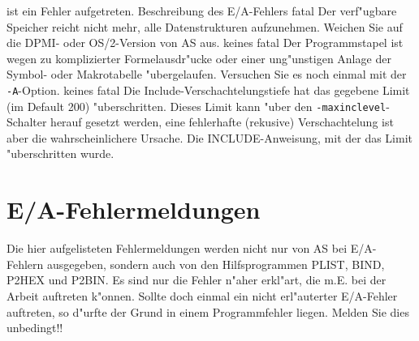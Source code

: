 \documentclass[12pt,a4paper,twoside]{report}
\newcommand{\tty}[1]{{\tt #1}}
\begin{document}
\begin{description}
{                ist ein Fehler aufgetreten.}
               {Beschreibung des E/A-Fehlers}
               {fatal}
               {Der verf"ugbare Speicher reicht nicht mehr,
	        alle Datenstrukturen aufzunehmen.  Weichen Sie auf die
	        DPMI- oder OS/2-Version von AS aus.}
               {keines}
               {fatal}
               {Der Programmstapel ist wegen zu komplizierter
	        Formelausdr"ucke oder einer ung"unstigen Anlage der Symbol-
	        oder Makrotabelle "ubergelaufen.  Versuchen Sie es noch
	        einmal mit der \tty{-A}-Option.}
               {keines}
               {fatal}
               {Die Include-Verschachtelungstiefe hat das gegebene Limit
                (im Default 200) "uberschritten.  Dieses Limit kann "uber
                den {\tt -maxinclevel}-Schalter herauf gesetzt werden, eine
                fehlerhafte (rekusive) Verschachtelung ist aber die
                wahrscheinlichere Ursache.}
               {Die INCLUDE-Anweisung, mit der das Limit "uberschritten wurde.}
\end{description}


\cleardoublepage
\chapter{E/A-Fehlermeldungen}

Die hier aufgelisteten Fehlermeldungen werden nicht nur von AS bei E/A-
Fehlern ausgegeben, sondern auch von den Hilfsprogrammen PLIST, BIND,
P2HEX und P2BIN.  Es sind nur die Fehler n"aher erkl"art, die m.E. bei
der Arbeit auftreten k"onnen.  Sollte doch einmal ein nicht erl"auterter
E/A-Fehler auftreten, so d"urfte der Grund in einem Programmfehler
liegen.  Melden Sie dies unbedingt!!
\end{document}
